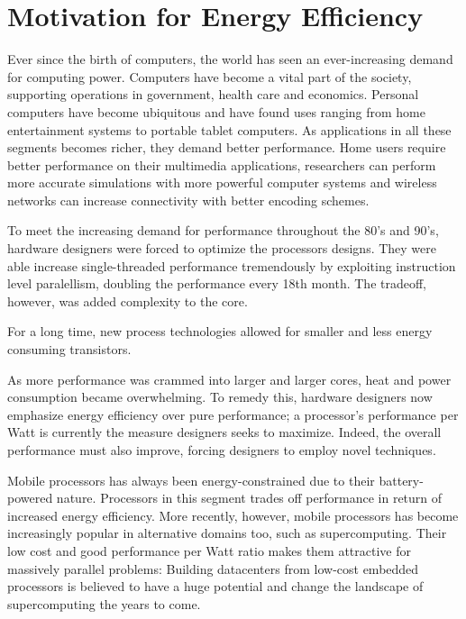 \section{Motivation for Energy Efficiency}

Ever since the birth of computers, the world has seen an ever-increasing demand
for computing power. Computers have become a vital part of the society,
supporting operations in government, health care and economics. Personal
computers have become ubiquitous and have found uses ranging from home
entertainment systems to portable tablet computers. As applications in all these
segments becomes richer, they demand better performance. Home users require
better performance on their multimedia applications, researchers can perform
more accurate simulations with more powerful computer systems and wireless
networks can increase connectivity with better encoding schemes.

To meet the increasing demand for performance throughout the 80's and 90's,
hardware designers were forced to optimize the processors designs. They were
able increase single-threaded performance tremendously by exploiting instruction
level paralellism, doubling the performance every 18th month. The tradeoff,
however, was added complexity to the core.


For a long time, new process technologies allowed for smaller and less energy
consuming transistors.




As more performance was crammed into larger and larger cores, heat and
power consumption became overwhelming. To remedy this, hardware designers now
emphasize energy efficiency over pure performance; a processor's performance per
Watt is currently the measure designers seeks to maximize. Indeed, the overall
performance must also improve, forcing designers to employ novel techniques.


Mobile processors has always been energy-constrained due to their
battery-powered nature. Processors in this segment trades off performance in
return of increased energy efficiency. More recently, however, mobile processors
has become increasingly popular in alternative domains too, such as
supercomputing. Their low cost and good performance per Watt ratio makes them
attractive for massively parallel problems: Building datacenters from low-cost
embedded processors is believed to have a huge potential and change the
landscape of supercomputing the years to come.

